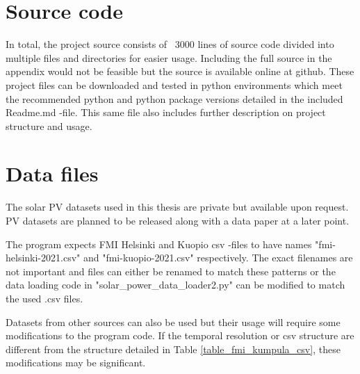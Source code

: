 \appendix
\section{Source code}
In total, the project source consists of ~3000 lines of source code divided into multiple files and directories for easier usage. Including the full source in the appendix would not be feasible but the source is available online at github\cite{project_source}. These project files can be downloaded and tested in python environments which meet the recommended python and python package versions detailed in the included Readme.md -file. This same file also includes further description on project structure and usage.


\section{Data files}
The solar PV datasets used in this thesis are private but available upon request. PV datasets are planned to be released along with a data paper at a later point.

The program expects FMI Helsinki and Kuopio csv -files to have names "fmi-helsinki-2021.csv" and "fmi-kuopio-2021.csv" respectively. The exact filenames are not important and files can either be renamed to match these patterns or the data loading code in "solar\_power\_data\_loader2.py" can be modified to match the used .csv files.

Datasets from other sources can also be used but their usage will require some modifications to the program code. If the temporal resolution or csv structure are different from the structure detailed in Table \ref{table_fmi_kumpula_csv}, these modifications may be significant.